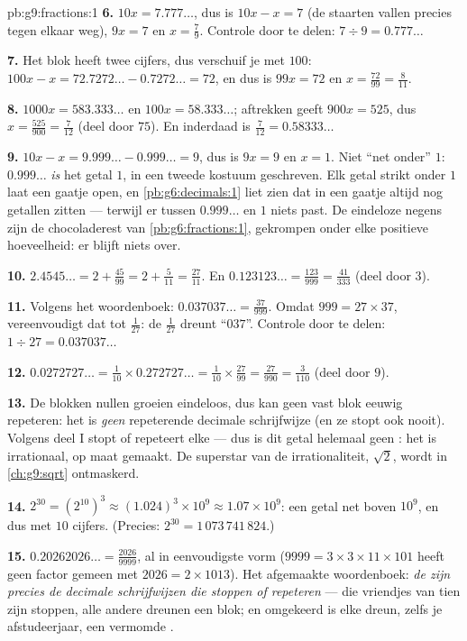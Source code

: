 \begin{solution}{pb:g9:fractions:1}
\textbf{6.} $10x = 7.777\ldots$, dus is $10x - x = 7$ (de staarten vallen precies
tegen elkaar weg), $9x = 7$ en $x = \frac79$. Controle door te delen:
$7 \div 9 = 0.777\ldots$

\textbf{7.} Het blok heeft twee cijfers, dus verschuif je met $100$:
$100x - x = 72.7272\ldots - 0.7272\ldots = 72$, en dus is $99x = 72$ en
$x = \frac{72}{99} = \frac{8}{11}$.

\textbf{8.} $1000x = 583.333\ldots$ en $100x = 58.333\ldots$; aftrekken geeft
$900x = 525$, dus $x = \frac{525}{900} = \frac{7}{12}$ (deel door $75$). En
inderdaad is $\frac{7}{12} = 0.58333\ldots$

\textbf{9.} $10x - x = 9.999\ldots - 0.999\ldots = 9$, dus is $9x = 9$ en
$x = 1$. Niet ``net onder'' $1$: $0.999\ldots$ \emph{is} het getal $1$, in een
tweede kostuum geschreven. Elk getal strikt onder $1$ laat een gaatje open, en
\cref{pb:g6:decimals:1} liet zien dat in een gaatje altijd nog getallen zitten
--- terwijl er tussen $0.999\ldots$ en $1$ niets past. De eindeloze negens zijn de
chocoladerest van \cref{pb:g6:fractions:1}, gekrompen onder elke positieve
hoeveelheid: er blijft niets over.

\textbf{10.} $2.4545\ldots = 2 + \frac{45}{99} = 2 + \frac{5}{11} =
\frac{27}{11}$. En $0.123123\ldots = \frac{123}{999} = \frac{41}{333}$ (deel door
$3$).

\textbf{11.} Volgens het woordenboek: $0.037037\ldots = \frac{37}{999}$. Omdat
$999 = 27 \times 37$, vereenvoudigt dat tot $\frac{1}{27}$: de 
$\frac{1}{27}$ dreunt ``$037$''. Controle door te delen:
$1 \div 27 = 0.037037\ldots$

\textbf{12.} $0.0272727\ldots = \frac{1}{10} \times 0.272727\ldots
= \frac{1}{10} \times \frac{27}{99} = \frac{27}{990} = \frac{3}{110}$ (deel door
$9$).

\textbf{13.} De blokken nullen groeien eindeloos, dus kan geen vast blok eeuwig
repeteren: het is \emph{geen} repeterende decimale schrijfwijze (en ze stopt ook
nooit). Volgens deel I stopt of repeteert elke  --- dus is dit getal
helemaal geen : het is irrationaal, op maat gemaakt. De superstar van de
irrationaliteit, $\sqrt2$, wordt in \cref{ch:g9:sqrt} ontmaskerd.

\textbf{14.} $2^{30} = \left(2^{10}\right)^3 \approx (1.024)^3 \times 10^9
\approx 1.07 \times 10^9$: een getal net boven $10^9$, en dus met $10$ cijfers.
(Precies: $2^{30} = 1\,073\,741\,824$.)

\textbf{15.} $0.20262026\ldots = \frac{2026}{9999}$, al in eenvoudigste vorm
($9999 = 3 \times 3 \times 11 \times 101$ heeft geen factor gemeen met
$2026 = 2 \times 1013$). Het afgemaakte woordenboek: \emph{de  zijn precies
de decimale schrijfwijzen die stoppen of repeteren} ---  die vriendjes van
tien zijn stoppen, alle andere dreunen een blok; en omgekeerd is elke dreun, zelfs
je afstudeerjaar, een vermomde .
\end{solution}
